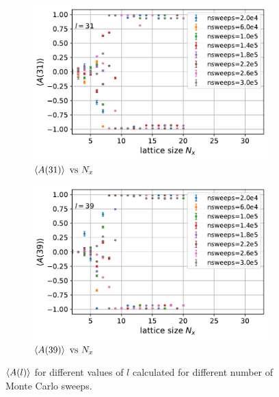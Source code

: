 \documentclass[../thesis_main.tex]{subfiles}
\begin{document}
\begin{figure}[!htb]\ContinuedFloat
    \centering
    \begin{subfigure}[b]{0.47\textwidth}
        \centering
        \includegraphics[width=\textwidth]{images/expval(A_l)_vs_N_x/A vs N_x (l=31).pdf}
        \caption{$\expval{A(31)} \text{ vs } N_x$}
    \end{subfigure}
    \hspace{1em}  %
    \begin{subfigure}[b]{0.47\textwidth}
        \centering
        \includegraphics[width=\textwidth]{images/expval(A_l)_vs_N_x/A vs N_x (l=39).pdf}
        \caption{$\expval{A(39)} \text{ vs } N_x$}
    \end{subfigure}
    \caption{$\expval{A(l)}$ for different values of $l$ calculated for different number of Monte Carlo sweeps.}\label{expvalA(l)_vs_N_x}
\end{figure}
\end{document}
